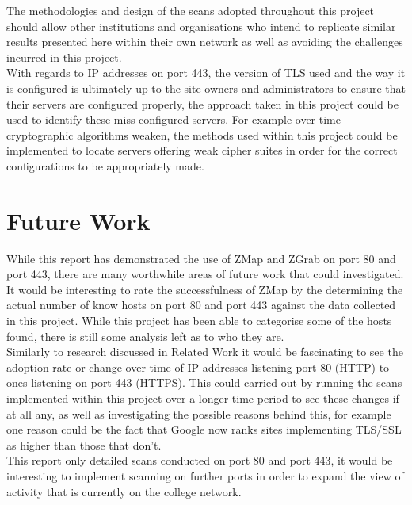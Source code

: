 \documentclass[a4wide,leqno,12pt]{report}
\begin{document}
The methodologies and design of the scans adopted throughout this project should allow other institutions and organisations who intend to replicate similar results presented here within their own network as well as avoiding the challenges incurred in this project.\\

With regards to IP addresses on port 443, the version of TLS used and the way it is configured is ultimately up to the site owners and administrators to ensure that their servers are configured properly, the approach taken in this project could be used to identify these miss configured servers. For example over time cryptographic algorithms weaken, the methods used within this project could be implemented to locate servers offering weak cipher suites in order for the correct configurations to be appropriately made. 

\chapter{Future Work}
While this report has demonstrated the use of ZMap and ZGrab on port 80 and port 443, there are many worthwhile areas of future work that could investigated.\\

It would be interesting to rate the successfulness of ZMap by the determining the actual number of know hosts on port 80 and port 443 against the data collected in this project. While this project has been able to categorise some of the hosts found, there is still some analysis left as to who they are.\\


Similarly to research discussed in Related Work \cite{durumeric2013zmap} \cite{durumeric2013analysis} it would be fascinating to see the adoption rate or change over time of IP addresses listening port 80 (HTTP) to ones listening on port 443 (HTTPS). This could carried out by running the scans implemented within this project over a longer time period to see these changes if at all any, as well as investigating the possible reasons behind this, for example one reason could be the fact that Google now ranks sites implementing TLS/SSL as higher than those that don't.\\

This report only detailed scans conducted on port 80 and port 443, it would be interesting to implement scanning on further ports in order to expand the view of activity that is currently on the college network.\\
\end{document}
